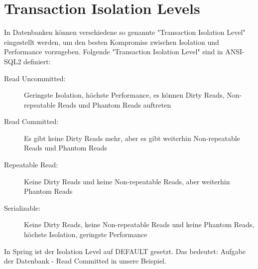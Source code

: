\documentclass[a4paper,10pt]{scrreprt}
\begin{document}
\section{Transaction Isolation Levels}
In Datenbanken können verschiedene so genannte "Transaction Isolation Level" eingestellt werden,
um den besten Kompromiss zwischen Isolation und Performance vorzugeben. Folgende
"Transaction Isolation Level" sind in ANSI-SQL2 definiert:
\begin{description}
\item[Read Uncommitted:] Geringste Isolation, höchste Performance, es können Dirty Reads, Non-
repeatable Reads und Phantom Reads auftreten
\item[Read Committed:] Es gibt keine Dirty Reads mehr, aber es gibt weiterhin Non-repeatable Reads und
Phantom Reads
\item[Repeatable Read:] Keine Dirty Reads und keine Non-repeatable Reads, aber weiterhin Phantom
Reads
\item[Serializable:]Keine Dirty Reads, keine Non-repeatable Reads und keine Phantom Reads,
höchste Isolation, geringste Performance
\end{description}
\begin{framed}
In Spring ist der Isolation Level auf DEFAULT gesetzt. Das bedeutet: Aufgabe der Datenbank - Read Committed in unsere 
Beispiel.
\end{framed}
\end{document}
